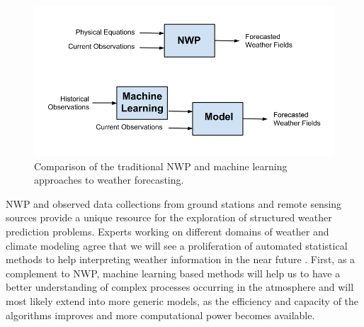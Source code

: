 \medskip

\begin{figure}[h]
 \centerline{\includegraphics[width=12cm]{nwp_vs_ml.png}} \caption{Comparison of the traditional NWP and machine learning approaches to weather forecasting.}\label{nwp_vs_ml}
\end{figure}

\medskip

NWP and observed data collections from ground stations and remote sensing sources provide a unique resource for the exploration of structured weather prediction problems. Experts working on different domains of weather and climate modeling agree that we will see a proliferation of automated statistical methods to help interpreting weather information in the near future \citep{jones2017ml}. First, as a complement to NWP, machine learning based methods will help us to have a better understanding of complex processes occurring in the atmosphere and will most likely extend into more generic models, as the efficiency and capacity of the algorithms improves and more computational power becomes available.

\medskip


